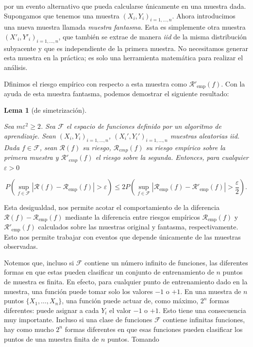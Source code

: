 \documentclass{report}
\newtheorem{lem}{Lema}[section]
\begin{document}
por un evento alternativo que pueda calcularse únicamente en una muestra dada. Supongamos que tenemos una muestra 
\((X_i, Y_i)_{i=1,\dots,n}\). Ahora introducimos una nueva muestra llamada \textit{muestra fantasma}. 
Esta es simplemente otra muestra \((X'_i, Y'_i)_{i=1,\dots,n}\), que también se extrae de manera 
\textit{iid} de la misma distribución subyacente y que es independiente de la primera muestra. No necesitamos generar 
esta muestra en la práctica; es solo una herramienta matemática para realizar el análisis. \newline

Dfinimos el riesgo empírico con respecto a esta muestra como \(\mathcal{R}'_{\text{emp}}(f)\). 
Con la ayuda de esta muestra fantasma, podemos demostrar el siguiente resultado:\newline

\begin{lem}[de simetrización] \label{lema de simetrizacion}

Sea $m\varepsilon^2 \geq 2$. Sea $\mathcal{F}$ el espacio de funciones definido por un algoritmo de aprendizaje. Sean
$(X_i,Y_i)_{i=1,\dots, n}$, $(X_i',Y_i')_{i=1,\dots, n}$ muestras aleatorias iid. Dada $f \in\mathcal{F}$,
sean $\mathcal{R}(f)$ su riesgo, $\mathcal{R}_{emp}(f)$ su riesgo empírico sobre la primera muestra y 
$\mathcal{R}'_{emp}(f)$ el riesgo sobre la segunda. Entonces, para cualquier $\varepsilon > 0$

\[
P\left(\sup_{f \in \mathcal{F}} |\mathcal{R}(f) - \mathcal{R}_{\text{emp}}(f)| > 
\varepsilon \right) \leq 2P\left(\sup_{f \in \mathcal{F}} |\mathcal{R}_{\text{emp}}(f) - \mathcal{R}'_{\text{emp}}(f)| > \frac{\varepsilon}{2}\right).
\]\newline
\end{lem}

Esta desigualdad, nos permite acotar el comportamiento 
de la diferencia \(\mathcal{R}(f) - \mathcal{R}_{\text{emp}}(f)\) mediante la diferencia entre riesgos empíricos \(\mathcal{R}_{\text{emp}}(f)\) y 
\(\mathcal{R}'_{\text{emp}}(f)\) calculados sobre las muestras original y fantasma, respectivamente. Esto nos permite trabajar 
con eventos que depende únicamente de las muestras observadas.\newline

Notemos que, incluso si \(\mathcal{F}\) contiene un número infinito de funciones, 
las diferentes formas en que estas pueden clasificar un conjunto de entrenamiento de \(n\) puntos de muestra 
es finita. En efecto, para cualquier punto de entrenamiento dado en la muestra, una función puede tomar solo los valores 
\(-1\) o \(+1\). En una muestra de \(n\) puntos \(\{X_1, \dots, X_n\}\), una función puede actuar de, como 
máximo, \(2^n\) formas diferentes: puede asignar a cada \(Y_i\) el valor \(-1\) o \(+1\). Esto tiene una 
consecuencia muy importante. Incluso si una clase de funciones \(\mathcal{F}\) contiene infinitas funciones, hay como 
mucho \(2^n\) formas diferentes en que esas funciones pueden clasificar los puntos de una muestra finita de 
\(n\) puntos. Tomando
\end{document}
